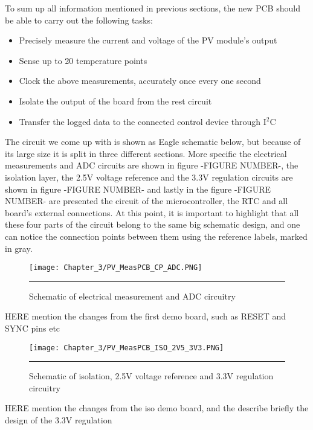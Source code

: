 To sum up all information mentioned in previous sections, the new PCB should be able to carry out the following tasks:

\begin{itemize}
    \item Precisely measure the current and voltage of the PV module's output
    \item Sense up to 20 temperature points
    \item Clock the above measurements, accurately once every one second
    \item Isolate the output of the board from the rest circuit
    \item Transfer the logged data to the connected control device through I$^2$C
\end{itemize}

 The circuit we come up with is shown as Eagle schematic below, but because of its large size it is split in three different sections. More specific the electrical measurements and ADC circuits are shown in figure -FIGURE NUMBER-, the isolation layer, the 2.5V voltage reference and the 3.3V regulation circuits are shown in figure -FIGURE NUMBER- and lastly in the figure -FIGURE NUMBER- are presented the circuit of the microcontroller, the RTC and all board's external connections. At this point, it is important to highlight that all these four parts of the circuit belong to the same big schematic design, and one can notice the connection points between them using the reference labels, marked in gray.\\
 
 \begin{figure}[htbp]
	\centering
		\texttt{[image: Chapter\_3/PV\_MeasPCB\_CP\_ADC.PNG]}
		\rule{35em}{0.5pt}
	\caption{Schematic of electrical measurement and ADC circuitry}
	\label{fig:PV_MeasPCB_CP_ADC}
\end{figure}
 
 HERE mention the changes from the first demo board, such as RESET and SYNC pins etc\\
 
\begin{figure}[htbp]
	\centering
		\texttt{[image: Chapter\_3/PV\_MeasPCB\_ISO\_2V5\_3V3.PNG]}
		\rule{35em}{0.5pt}
	\caption{Schematic of isolation, 2.5V voltage reference and 3.3V regulation circuitry}
	\label{fig:PV_MeasPCB_ISO_2V5_3V3}
\end{figure}
 
 HERE mention the changes from the iso demo board, and the describe briefly the design of the 3.3V regulation\\
 

